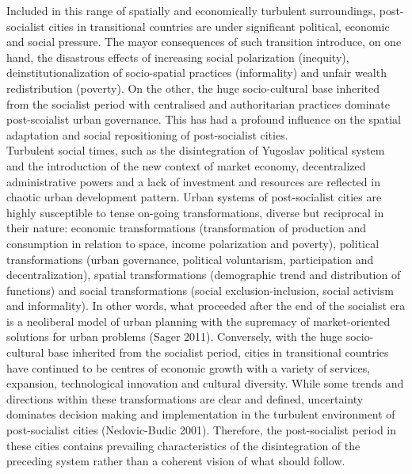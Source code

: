 \documentclass[11pt]{report}
\begin{document}
Included in this range of spatially and economically turbulent surroundings, post-socialist cities in transitional countries are under significant political, economic and social pressure. The mayor consequences of such transition introduce, on one hand, the disastrous effects of increasing social polarization (inequity), deinstitutionalization of socio-spatial practices (informality) and unfair wealth redistribution (poverty). On the other, the huge socio-cultural base inherited from the socialist period with centralised and authoritarian practices dominate post-scoialist urban governance. This has had a profound influence on the spatial adaptation and social repositioning of post-socialist cities.
\\
Turbulent social times, such as the disintegration of Yugoslav political system and the introduction of the new context of market economy, decentralized administrative powers and a lack of investment and resources are reflected in chaotic urban development pattern. Urban systems of post-socialist cities are highly susceptible to tense on-going transformations, diverse but reciprocal in their nature: economic transformations (transformation of production and consumption in relation to space, income polarization and poverty), political transformations (urban governance, political voluntarism, participation and decentralization), spatial transformations (demographic trend and distribution of functions) and social transformations (social exclusion-inclusion, social activism and informality). In other words, what proceeded after the end of the socialist era is a neoliberal model of urban planning with the supremacy of market-oriented solutions for urban problems (Sager 2011). Conversely, with the huge socio-cultural base inherited from the socialist period, cities in transitional countries have continued to be centres of economic growth with a variety of services, expansion, technological innovation and cultural diversity. While some trends and directions within these transformations are clear and defined, uncertainty dominates decision making and implementation in the turbulent environment of post-socialist cities (Nedovic-Budic 2001). Therefore, the post-socialist period in these cities contains prevailing characteristics of the disintegration of the preceding system rather than a coherent vision of what should follow. 
\\
\end{document}
